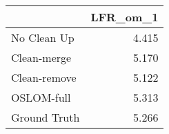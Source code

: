 \begin{tabular}{lr}
\toprule
{} & LFR_om_1 \\
\midrule
No Clean Up  &    4.415 \\
Clean-merge  &    5.170 \\
Clean-remove &    5.122 \\
OSLOM-full   &    5.313 \\
Ground Truth &    5.266 \\
\bottomrule
\end{tabular}
